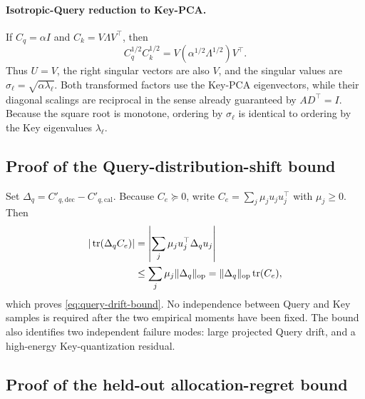 \paragraph{Isotropic-Query reduction to Key-PCA.}
If $C_q=\alpha I$ and $C_k=V\Lambda V^\top$, then
\begin{equation}
 C_q^{1/2}C_k^{1/2}
 =V(\alpha^{1/2}\Lambda^{1/2})V^\top.
\end{equation}
Thus $U=V$, the right singular vectors are also $V$, and the singular values
are $\sigma_\ell=\sqrt{\alpha\lambda_\ell}$.
Both transformed factors use the Key-PCA eigenvectors, while their diagonal
scalings are reciprocal in the sense already guaranteed by $AD^\top=I$.
Because the square root is monotone, ordering by $\sigma_\ell$ is identical
to ordering by the Key eigenvalues $\lambda_\ell$.

\subsection{Proof of the Query-distribution-shift bound}

Set
$\Delta_q=C'_{q,\mathrm{dec}}-C'_{q,\mathrm{cal}}$.
Because $C_e\succeq0$, write
$C_e=\sum_j\mu_j u_ju_j^\top$ with $\mu_j\ge0$.  Then
\begin{align}
 |\operatorname{tr}(\Delta_qC_e)|
 &=\left|\sum_j\mu_j u_j^\top\Delta_q u_j\right|\\
 &\le\sum_j\mu_j\|\Delta_q\|_{\mathrm{op}}
 =\|\Delta_q\|_{\mathrm{op}}\operatorname{tr}(C_e),
\end{align}
which proves \cref{eq:query-drift-bound}.  No independence between Query and
Key samples is required after the two empirical moments have been fixed.
The bound also identifies two independent failure modes: large projected
Query drift, and a high-energy Key-quantization residual.

\subsection{Proof of the held-out allocation-regret bound}

